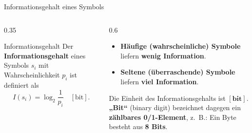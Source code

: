 \begin{frame}{Informationsgehalt eines Symbols}

\begin{columns}

\begin{column}{0.35\textwidth}

\begin{blockDef}{Informationsgehalt}
Der \textbf{Informationsgehalt} eines Symbols \(s_i\) mit Wahrscheinlichkeit \(p_i\) ist definiert als
\[
I(s_i) = \log_2 \frac{1}{p_i} \quad [\text{bit}].
\]
\end{blockDef}

\end{column}

\begin{column}{0.6\textwidth}

\begin{itemize}
  \item \textbf{Häufige (wahrscheinliche) Symbole} liefern \textbf{wenig Information}.
  \item \textbf{Seltene (überraschende) Symbole} liefern \textbf{viel Information}.
\end{itemize}

\medskip

Die Einheit des Informationsgehalts ist \(\mathbf{[\text{bit}]}\).  
\textbf{„Bit“} (binary digit) bezeichnet dagegen ein \textbf{zählbares 0/1-Element}, z.~B.:
Ein Byte besteht aus \textbf{8 Bits}.

\end{column}

\end{columns}

\end{frame}


